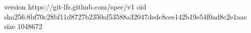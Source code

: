 version https://git-lfs.github.com/spec/v1
oid sha256:8bf70c28bf11d8727b2350af53588a32047dedc8cee142b19e54f0ad8c2e1aac
size 1048672

